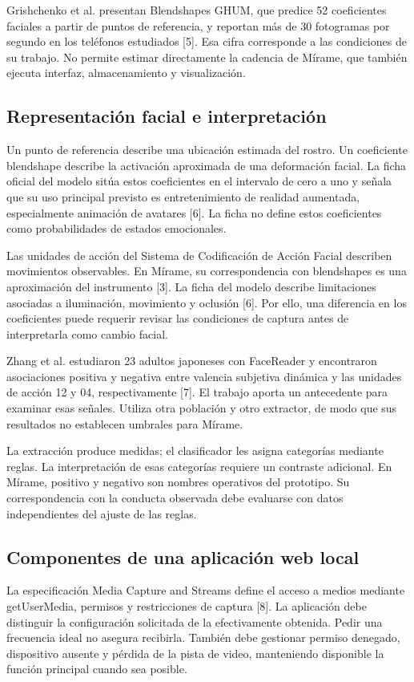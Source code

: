 \documentclass[conference,letterpaper]{IEEEtran}
\begin{document}
Grishchenko et al. presentan Blendshapes GHUM, que predice 52 coeficientes faciales a partir de puntos de referencia, y reportan más de 30 fotogramas por segundo en los teléfonos estudiados [5]. Esa cifra corresponde a las condiciones de su trabajo. No permite estimar directamente la cadencia de Mírame, que también ejecuta interfaz, almacenamiento y visualización.


\subsection{Representación facial e interpretación}
Un punto de referencia describe una ubicación estimada del rostro. Un coeficiente blendshape describe la activación aproximada de una deformación facial. La ficha oficial del modelo sitúa estos coeficientes en el intervalo de cero a uno y señala que su uso principal previsto es entretenimiento de realidad aumentada, especialmente animación de avatares [6]. La ficha no define estos coeficientes como probabilidades de estados emocionales.

Las unidades de acción del Sistema de Codificación de Acción Facial describen movimientos observables. En Mírame, su correspondencia con blendshapes es una aproximación del instrumento [3]. La ficha del modelo describe limitaciones asociadas a iluminación, movimiento y oclusión [6]. Por ello, una diferencia en los coeficientes puede requerir revisar las condiciones de captura antes de interpretarla como cambio facial.

Zhang et al. estudiaron 23 adultos japoneses con FaceReader y encontraron asociaciones positiva y negativa entre valencia subjetiva dinámica y las unidades de acción 12 y 04, respectivamente [7]. El trabajo aporta un antecedente para examinar esas señales. Utiliza otra población y otro extractor, de modo que sus resultados no establecen umbrales para Mírame.

La extracción produce medidas; el clasificador les asigna categorías mediante reglas. La interpretación de esas categorías requiere un contraste adicional. En Mírame, positivo y negativo son nombres operativos del prototipo. Su correspondencia con la conducta observada debe evaluarse con datos independientes del ajuste de las reglas.


\subsection{Componentes de una aplicación web local}
La especificación Media Capture and Streams define el acceso a medios mediante getUserMedia, permisos y restricciones de captura [8]. La aplicación debe distinguir la configuración solicitada de la efectivamente obtenida. Pedir una frecuencia ideal no asegura recibirla. También debe gestionar permiso denegado, dispositivo ausente y pérdida de la pista de video, manteniendo disponible la función principal cuando sea posible.
\end{document}
